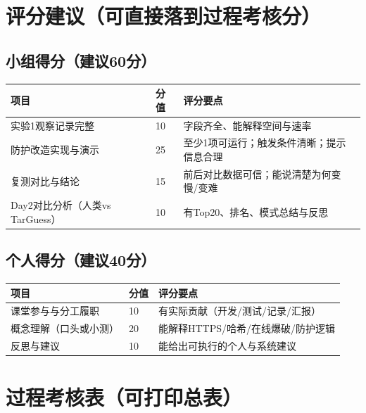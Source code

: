 \documentclass[UTF8,a4paper,12pt]{ctexart}
\begin{document}
\section{评分建议（可直接落到过程考核分）}
\subsection*{小组得分（建议60分）}
\begin{longtable}{@{}p{}p{}p{}@{}}
\toprule
\textbf{项目} & \textbf{分值} & \textbf{评分要点} \\
\midrule
\endhead
实验1观察记录完整 & 10 & 字段齐全、能解释空间与速率 \\
防护改造实现与演示 & 25 & 至少1项可运行；触发条件清晰；提示信息合理 \\
复测对比与结论 & 15 & 前后对比数据可信；能说清楚为何变慢/变难 \\
Day2对比分析（人类vs TarGuess） & 10 & 有Top20、排名、模式总结与反思 \\
\bottomrule
\end{longtable}

\subsection*{个人得分（建议40分）}
\begin{longtable}{@{}p{}p{}p{}@{}}
\toprule
\textbf{项目} & \textbf{分值} & \textbf{评分要点} \\
\midrule
\endhead
课堂参与与分工履职 & 10 & 有实际贡献（开发/测试/记录/汇报） \\
概念理解（口头或小测） & 20 & 能解释HTTPS/哈希/在线爆破/防护逻辑 \\
反思与建议 & 10 & 能给出可执行的个人与系统建议 \\
\bottomrule
\end{longtable}

\section{过程考核表（可打印总表）}
\end{document}
